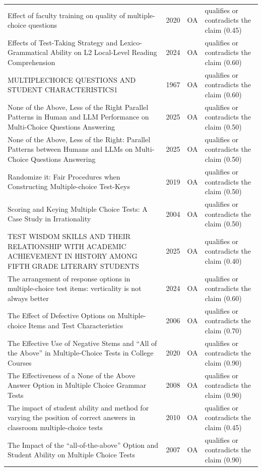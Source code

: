 \begin{longtable}{@{}%
  >{\raggedright\arraybackslash}p{}c%
  >{\raggedright\arraybackslash}p{}%
  >{\raggedright\arraybackslash}p{}@{}}
Effect of faculty training on quality of multiple-choice questions & 2020 & OA & qualifies or contradicts the claim (0.45) \\
Effects of Test-Taking Strategy and Lexico-Grammatical Ability on L2 Local-Level Reading Comprehension & 2024 & OA & qualifies or contradicts the claim (0.60) \\
MULTIPLECHOICE QUESTIONS AND STUDENT CHARACTERISTICS1 & 1967 & OA & qualifies or contradicts the claim (0.60) \\
None of the Above, Less of the Right Parallel Patterns in Human and LLM Performance on Multi-Choice Questions Answering & 2025 & OA & qualifies or contradicts the claim (0.50) \\
None of the Above, Less of the Right: Parallel Patterns between Humans and LLMs on Multi-Choice Questions Answering & 2025 & OA & qualifies or contradicts the claim (0.50) \\
Randomize it: Fair Procedures when Constructing Multiple-choice Test-Keys & 2019 & OA & qualifies or contradicts the claim (0.50) \\
Scoring and Keying Multiple Choice Tests: A Case Study in Irrationality & 2004 & OA & qualifies or contradicts the claim (0.50) \\
TEST WISDOM SKILLS AND THEIR RELATIONSHIP WITH ACADEMIC ACHIEVEMENT IN HISTORY AMONG FIFTH GRADE LITERARY STUDENTS & 2025 & OA & qualifies or contradicts the claim (0.40) \\
The arrangement of response options in multiple-choice test items: verticality is not always better & 2024 & OA & qualifies or contradicts the claim (0.60) \\
The Effect of Defective Options on Multiple-choice Items and Test Characteristics & 2006 & OA & qualifies or contradicts the claim (0.70) \\
The Effective Use of Negative Stems and ``All of the Above'' in Multiple-Choice Tests in College Courses & 2020 & OA & qualifies or contradicts the claim (0.90) \\
The Effectiveness of a \textquotedbl{}None of the Above\textquotedbl{} Answer Option in Multiple Choice Grammar Tests & 2008 & OA & qualifies or contradicts the claim (0.90) \\
The impact of student ability and method for varying the position of correct answers in classroom multiple-choice tests & 2010 & OA & qualifies or contradicts the claim (0.45) \\
The Impact of the ``all-of-the-above'' Option and Student Ability on Multiple Choice Tests & 2007 & OA & qualifies or contradicts the claim (0.90) \\

\end{longtable}
